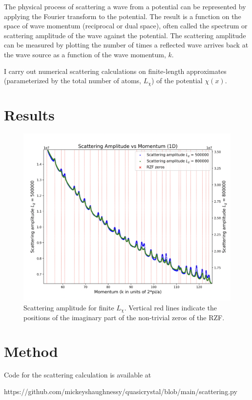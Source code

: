 \documentclass[11pt, oneside]{article}   	%
\begin{document}
The physical process of scattering a wave from a potential can be represented by applying the Fourier transform to the potential. The result is a function on the space of wave momentum (reciprocal or dual space), often called the spectrum or scattering amplitude of the wave against the potential. The scattering amplitude can be measured by plotting the number of times a reflected wave arrives back at the wave source as a function of the wave momentum, $k$.

I carry out numerical scattering calculations on finite-length approximates (parameterized by the total number of atoms, $L_{\chi}$) of the potential $\chi(x)$.

\section{Results}
\begin{figure}[htbp]
\begin{center}
    \includegraphics[width=0.8\linewidth]{../images/zoomed_scattering.png}
   
\caption{Scattering amplitude for finite $L_{\chi}$. Vertical red lines indicate the positions of the imaginary part of the non-trivial zeros of the RZF.}
\label{default}
\end{center}
\end{figure}


\section{Method}

 Code for the scattering calculation is available at 
 
 https://github.com/mickeyshaughnessy/quasicrystal/blob/main/scattering.py
 
\end{document}
